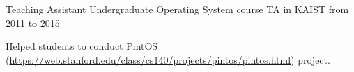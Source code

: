 

\begin{cventries}

  \cventry
    {Teaching Assistant} %
    {Undergraduate Operating System course TA in KAIST from 2011 to 2015} %
    {} %
    {} %
    {
      \begin{cvitems} %
      \item {Helped students to conduct PintOS
          (\url{https://web.stanford.edu/class/cs140/projects/pintos/pintos.html})
      project.}
      \end{cvitems}
    }

\end{cventries}
